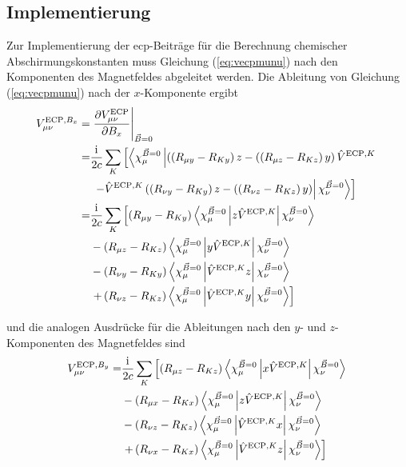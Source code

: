 	\subsection{Implementierung}
	Zur Implementierung der \ac{ecp}-Beiträge für die Berechnung chemischer Abschirmungskonstanten muss Gleichung (\ref{eq:vecpmunu}) nach den Komponenten des Magnetfeldes abgeleitet werden. Die Ableitung von Gleichung (\ref{eq:vecpmunu}) nach der $x$-Komponente ergibt
	\begin{equation}\label{eq:vecpdbx}
	\begin{aligned}
	V_{\mu\nu}^{\textrm{ECP},B_x}=&\left.\frac{\partial V_{\mu\nu}^{\textrm{ECP}}}{\partial B_x}\right\vert_{\vec{B}=0}\\
	=&\frac{\mathrm{i}\mkern1mu}{2c}\sum_K\left[\left\langle\chi_\mu^{\vec{B}=0}\left\vert\left(\left(R_{\mu y}-R_{Ky}\right)z-(\left(R_{\mu z}-R_{Kz}\right)y\right)\hat{V}^{\textrm{ECP},K}\right.\right.\right.\\
	&\left.\left.\left.-\hat{V}^{\textrm{ECP},K}\left(\left(R_{\nu y}-R_{Ky}\right)z-(\left(R_{\nu z}-R_{Kz}\right)y\right)\right\vert\chi_\nu^{\vec{B}=0}\right\rangle\right]\\
	=&\frac{\mathrm{i}\mkern1mu}{2c}\sum_K\left[\left(R_{\mu y}-R_{Ky}\right)\left\langle\chi_\mu^{\vec{B}=0}\left\vert z\hat{V}^{\textrm{ECP},K}\right\vert\chi_\nu^{\vec{B}=0}\right\rangle\right.\\
	&-\left(R_{\mu z}-R_{Kz}\right)\left\langle\chi_\mu^{\vec{B}=0}\left\vert y\hat{V}^{\textrm{ECP},K}\right\vert\chi_\nu^{\vec{B}=0}\right\rangle\\
	&-\left(R_{\nu y}-R_{Ky}\right)\left\langle\chi_\mu^{\vec{B}=0}\left\vert \hat{V}^{\textrm{ECP},K} z\right\vert\chi_\nu^{\vec{B}=0}\right\rangle\\
	&\left.+\left(R_{\nu z}-R_{Kz}\right)\left\langle\chi_\mu^{\vec{B}=0}\left\vert \hat{V}^{\textrm{ECP},K} y\right\vert\chi_\nu^{\vec{B}=0}\right\rangle\right]
	\end{aligned}
	\end{equation}
	
	und die analogen Ausdrücke für die Ableitungen nach den $y$- und $z$- Komponenten des Magnetfeldes sind 
	\begin{equation}\label{eq:vecpdby}
	\begin{aligned}
	V_{\mu\nu}^{\textrm{ECP},B_y}=&\frac{\mathrm{i}\mkern1mu}{2c}\sum_K\left[\left(R_{\mu z}-R_{Kz}\right)\left\langle\chi_\mu^{\vec{B}=0}\left\vert x\hat{V}^{\textrm{ECP},K}\right\vert\chi_\nu^{\vec{B}=0}\right\rangle\right.\\
	&-\left(R_{\mu x}-R_{Kx}\right)\left\langle\chi_\mu^{\vec{B}=0}\left\vert z\hat{V}^{\textrm{ECP},K}\right\vert\chi_\nu^{\vec{B}=0}\right\rangle\\
	&-\left(R_{\nu z}-R_{Kz}\right)\left\langle\chi_\mu^{\vec{B}=0}\left\vert \hat{V}^{\textrm{ECP},K}x\right\vert\chi_\nu^{\vec{B}=0}\right\rangle\\
	&\left.+\left(R_{\nu x}-R_{Kx}\right)\left\langle\chi_\mu^{\vec{B}=0}\left\vert \hat{V}^{\textrm{ECP},K} z\right\vert\chi_\nu^{\vec{B}=0}\right\rangle\right]
	\end{aligned}
	\end{equation}
	
